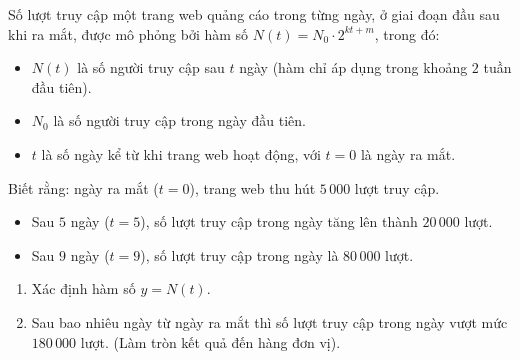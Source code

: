 \begin{ex}%
	Số lượt truy cập một trang web quảng cáo trong từng ngày, ở giai đoạn đầu sau khi ra mắt, được mô phỏng bởi hàm số $N(t)=N_0\cdot 2^{kt+m}$, trong đó:
	\begin{itemize}
		\item $N(t)$ là số người truy cập sau $t$ ngày (hàm chỉ áp dụng trong khoảng $2$ tuần đầu tiên).
		\item $N_0$ là số người truy cập trong ngày đầu tiên.
		\item $t$ là số ngày kể từ khi trang web hoạt động, với $t=0$ là ngày ra mắt.
	\end{itemize}
	Biết rằng: ngày ra mắt ($t=0$), trang web thu hút $5\,000$ lượt truy cập.
	\begin{itemize}
		\item Sau $5$ ngày ($t=5$), số lượt truy cập trong ngày tăng lên thành $20\,000$ lượt.
		\item Sau $9$ ngày ($t=9$), số lượt truy cập trong ngày là $80\,000$ lượt.
	\end{itemize}
	\begin{enumerate}
		\item Xác định hàm số $y=N(t)$.
		\item Sau bao nhiêu ngày từ ngày ra mắt thì số lượt truy cập trong ngày vượt mức $180\,000$ lượt. (Làm tròn kết quả đến hàng đơn vị).
	\end{enumerate}
\end{ex}
